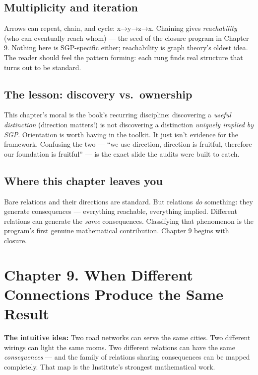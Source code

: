 \documentclass[
  11pt,
]{book}
\begin{document}
\section{Multiplicity and iteration}\label{multiplicity-and-iteration}

Arrows can repeat, chain, and cycle: x→y→z→x. Chaining gives
\emph{reachability} (who can eventually reach whom) --- the seed of the
closure program in Chapter 9. Nothing here is SGP-specific either;
reachability is graph theory's oldest idea. The reader should feel the
pattern forming: each rung finds real structure that turns out to be
standard.

\section{The lesson: discovery
vs.~ownership}\label{the-lesson-discovery-vs.-ownership}

This chapter's moral is the book's recurring discipline: discovering a
\emph{useful distinction} (direction matters!) is not discovering a
distinction \emph{uniquely implied by SGP}. Orientation is worth having
in the toolkit. It just isn't evidence for the framework. Confusing the
two --- ``we use direction, direction is fruitful, therefore our
foundation is fruitful'' --- is the exact slide the audits were built to
catch.

\section{Where this chapter leaves
you}\label{where-this-chapter-leaves-you-7}

Bare relations and their directions are standard. But relations
\emph{do} something: they generate consequences --- everything
reachable, everything implied. Different relations can generate the
\emph{same} consequences. Classifying that phenomenon is the program's
first genuine mathematical contribution. Chapter 9 begins with closure.

\newpage

\chapter{Chapter 9. When Different Connections Produce the Same
Result}\label{chapter-9.-when-different-connections-produce-the-same-result}

\textbf{The intuitive idea:} Two road networks can serve the same
cities. Two different wirings can light the same rooms. Two different
relations can have the same \emph{consequences} --- and the family of
relations sharing consequences can be mapped completely. That map is the
Institute's strongest mathematical work.
\end{document}
